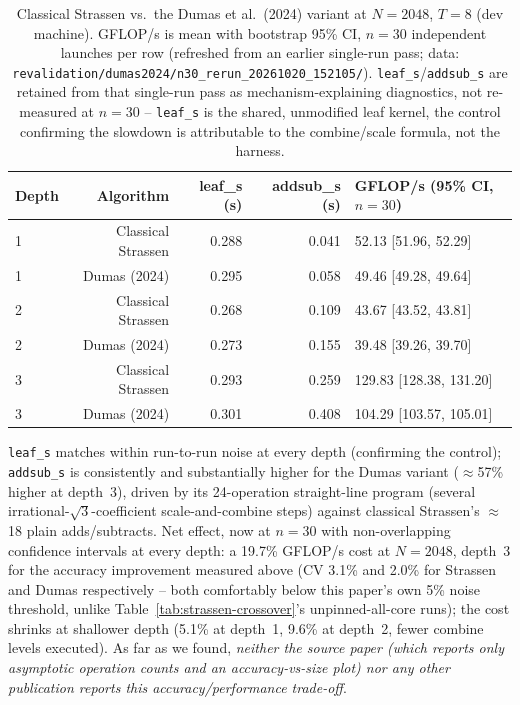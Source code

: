 \documentclass[acmsmall]{acmart}
\begin{document}
\begin{table}[h]
\centering
\caption{Classical Strassen vs.\ the Dumas et al.\ (2024) variant at
$N=2048$, $T=8$ (dev machine). GFLOP/s is mean with bootstrap 95\% CI,
$n{=}30$ independent launches per row (refreshed from an earlier
single-run pass; data:
\texttt{revalidation/dumas2024/n30\_rerun\_20261020\_152105/}).
\texttt{leaf\_s}/\texttt{addsub\_s} are retained from that single-run
pass as mechanism-explaining diagnostics, not re-measured at $n{=}30$
-- \texttt{leaf\_s} is the shared, unmodified leaf kernel, the control
confirming the slowdown is attributable to the combine/scale formula,
not the harness.}
\label{tab:dumas-perf}
\begin{tabular}{lrrrl}
\toprule
Depth & Algorithm & leaf\_s (s) & addsub\_s (s) & GFLOP/s (95\% CI, $n{=}30$) \\
\midrule
1 & Classical Strassen & 0.288 & 0.041 & 52.13 [51.96, 52.29] \\
1 & Dumas (2024)        & 0.295 & 0.058 & 49.46 [49.28, 49.64] \\
2 & Classical Strassen & 0.268 & 0.109 & 43.67 [43.52, 43.81] \\
2 & Dumas (2024)        & 0.273 & 0.155 & 39.48 [39.26, 39.70] \\
3 & Classical Strassen & 0.293 & 0.259 & 129.83 [128.38, 131.20] \\
3 & Dumas (2024)        & 0.301 & 0.408 & 104.29 [103.57, 105.01] \\
\bottomrule
\end{tabular}
\end{table}

\texttt{leaf\_s} matches within run-to-run noise at every depth
(confirming the control); \texttt{addsub\_s} is consistently and
substantially higher for the Dumas variant ($\approx$57\% higher at
depth~3), driven by its 24-operation straight-line program (several
irrational-$\sqrt3$-coefficient scale-and-combine steps) against
classical Strassen's $\approx$18 plain adds/subtracts. Net effect, now
at $n{=}30$ with non-overlapping confidence intervals at every depth: a
19.7\% GFLOP/s cost at $N{=}2048$, depth~3 for the accuracy improvement
measured above (CV 3.1\% and 2.0\% for Strassen and Dumas respectively
-- both comfortably below this paper's own 5\% noise threshold, unlike
Table~\ref{tab:strassen-crossover}'s unpinned-all-core runs); the cost
shrinks at shallower depth (5.1\% at depth~1, 9.6\% at depth~2, fewer
combine levels executed). As far as
we found, \emph{neither the source paper (which reports only
asymptotic operation counts and an accuracy-vs-size plot) nor any other
publication reports this accuracy/performance trade-off}.
\end{document}
